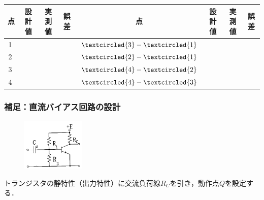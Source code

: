 \documentclass[10pt, a4j, dvipdfmx]{jarticle}
\begin{document}
    \begin{table}[H]
        \begin{tabular}{||c||c|c|c||c||c|c|c||}
        \hline\hline
        点                           & 設計値           & 実測値           & 誤差            & 点                                                           & 設計値           & 実測値           & 誤差            \\ \hline\hline
        \textcircled{\scriptsize 1} & \hspace{15mm} & \hspace{15mm} & \hspace{15mm} & $\textcircled{\scriptsize 3} - \textcircled{\scriptsize 1}$ & \hspace{15mm} & \hspace{15mm} & \hspace{15mm} \\ \hline
        \textcircled{\scriptsize 2} &               &               &               & $\textcircled{\scriptsize 2} - \textcircled{\scriptsize 1}$ &               &               &               \\ \hline
        \textcircled{\scriptsize 3} &               &               &               & $\textcircled{\scriptsize 4} - \textcircled{\scriptsize 2}$ &               &               &               \\ \hline
        \textcircled{\scriptsize 4} &               &               &               & $\textcircled{\scriptsize 4} - \textcircled{\scriptsize 3}$ &               &               &               \\ \hline\hline
        \end{tabular}
    \end{table}

    \subsubsection*{補足：直流バイアス回路の設計}
    \begin{figure}
        \vspace*{-\intextsep}
        \begin{center}
            \includegraphics[width=30mm]{fig-11.png}
            \caption{}
            \label{fig:10}
        \end{center}
    \end{figure}
    トランジスタの静特性（出力特性）に交流負荷線$R_C$を引き，動作点$Q$を設定する．
    
\end{document}
